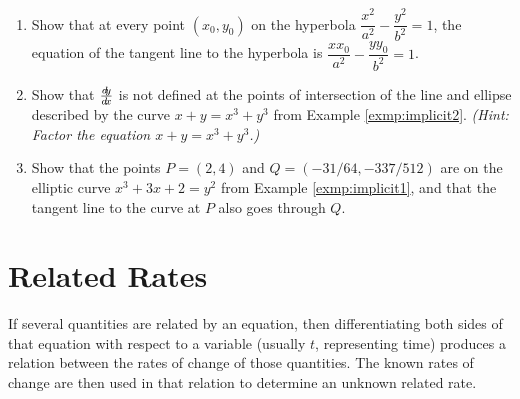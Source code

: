 {\begin{enumerate}[item-label={\bfseries \arabic*.}]
  $\dfrac{x x_0}{a^2} + \dfrac{y y_0}{b^2} = 1$.
 \item\label{exer:hyptan} Show that at every point $(x_0,y_0)$ on the hyperbola
  $\dfrac{x^2}{a^2} - \dfrac{y^2}{b^2} = 1$,
  the equation of the  tangent line to the hyperbola is
  $\dfrac{x x_0}{a^2} - \dfrac{y y_0}{b^2} = 1$.
 \item Show that $\frac{d\negmedspace y}{d\!x}$ is not defined at the points of intersection of the
  line and ellipse described by the curve $x+y=x^3+y^3$ from Example
  \ref{exmp:implicit2}. \emph{(Hint: Factor the equation $x+y=x^3+y^3$.)}
 \item Show that the points $P=(2,4)$ and $Q=(-31/64,-337/512)$ are on the
  elliptic curve $x^3+3x+2=y^2$ from Example \ref{exmp:implicit1}, and that the
  tangent line to the curve at $P$ also goes through $Q$.
\end{enumerate}
}
\newpage
\section{Related Rates}
If several quantities are related by an equation, then differentiating both
sides of that equation with respect to a variable (usually $t$, representing
time) produces a relation between the rates of change of those quantities.
The known rates of change are then used in that relation to determine an
unknown related rate.

